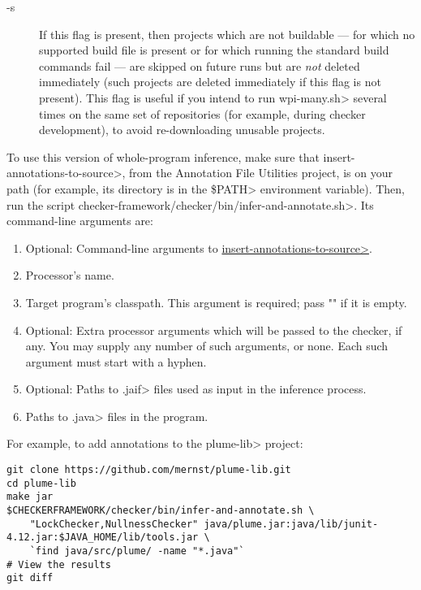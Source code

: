 \begin{description}
\item[-s]
  If this flag is present, then projects which are not buildable --- for which
  no supported build file is present or for which running the standard build
  commands fail --- are skipped on future runs but are \emph{not} deleted immediately
  (such projects are deleted immediately if this flag is not present). This flag is useful
  if you intend to run \<wpi-many.sh> several times on the same set of repositories
  (for example, during checker development), to avoid re-downloading unusable projects.

\end{description}



\begin{sloppypar}
To use this version of whole-program inference, make sure that
\<insert-annotations-to-source>, from the Annotation File Utilities project,
is on your path (for example, its directory is in the \<\$PATH> environment variable).
Then, run the script \<checker-framework/checker/bin/infer-and-annotate.sh>.
Its command-line arguments are:
\end{sloppypar}

\begin{enumerate}
\item Optional: Command-line arguments to
  \href{https://checkerframework.org/annotation-file-utilities/#insert-annotations-to-source}{\<insert-annotations-to-source>}.
\item Processor's name.
\item Target program's classpath.  This argument is required; pass "" if it
  is empty.
\item Optional: Extra processor arguments which will be passed to the checker, if any.
  You may supply any number of such arguments, or none.  Each such argument
  must start with a hyphen.
\item Optional: Paths to \<.jaif> files used as input in the inference
    process.
\item Paths to \<.java> files in the program.
\end{enumerate}

For example, to add annotations to the \<plume-lib> project:
\begin{Verbatim}
git clone https://github.com/mernst/plume-lib.git
cd plume-lib
make jar
$CHECKERFRAMEWORK/checker/bin/infer-and-annotate.sh \
    "LockChecker,NullnessChecker" java/plume.jar:java/lib/junit-4.12.jar:$JAVA_HOME/lib/tools.jar \
    `find java/src/plume/ -name "*.java"`
# View the results
git diff
\end{Verbatim}


